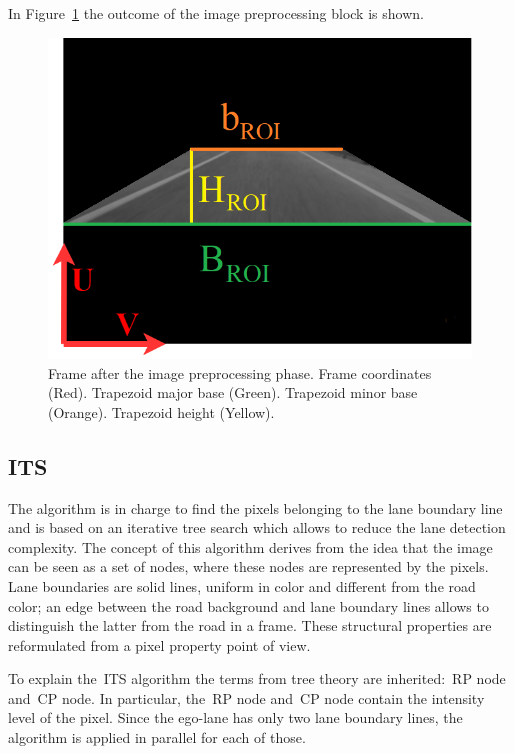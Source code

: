 In Figure~\ref{fig:final_image_preprocessing} the outcome of the image preprocessing  block is shown. 
%
\begin{figure}[ht]
	\centering
	\includegraphics[scale=0.55]{figure/Part1/Chapter4/figures/ROI.png}
	\caption{Frame after the image preprocessing phase. Frame coordinates (Red). Trapezoid major base (Green). Trapezoid minor base (Orange). Trapezoid height (Yellow).}
	\label{fig:final_image_preprocessing}
\end{figure}
%










\subsection{ITS}
\label{subsec:ITS}
The algorithm is in charge to find the pixels belonging to the lane boundary line and is based on an iterative tree search which allows to reduce the lane detection complexity. The concept of this algorithm derives from the idea that the image can be seen as a set of nodes, where these nodes are represented by the pixels. Lane boundaries are solid lines, uniform in color and different from the road color; an edge between the road background and lane boundary lines allows to distinguish the latter from the road in a frame. These structural properties are reformulated from a pixel property point of view.

To explain the~\gls{ITS} algorithm the terms from tree theory are inherited:~\gls{RP} node and~\gls{CP} node. 
In particular, the~\gls{RP} node and~\gls{CP} node contain the intensity level of the pixel. Since the ego-lane has only two lane boundary lines, the algorithm is applied in parallel for each of those.

